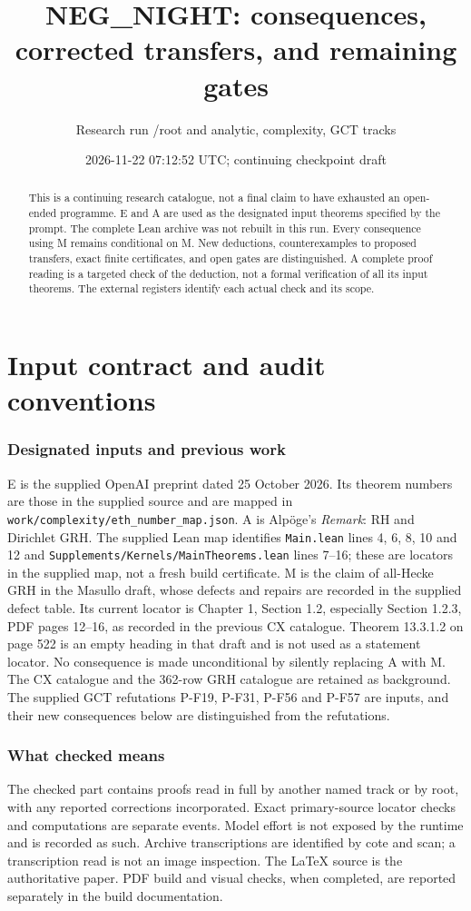 \documentclass[11pt]{article}
\title{NEG\_NIGHT: consequences, corrected transfers, and remaining gates}
\author{Research run /root and analytic, complexity, GCT tracks}
\date{2026-11-22 07:12:52 UTC; continuing checkpoint draft}
\theoremstyle{definition}
\begin{document}
\maketitle
\begin{abstract}
This is a continuing research catalogue, not a final claim to have exhausted
an open-ended programme. E and A are used as the designated input theorems
specified by the prompt. The complete Lean archive was not rebuilt in this
run. Every consequence using M remains conditional on M. New deductions,
counterexamples to proposed transfers, exact finite certificates, and open
gates are distinguished. A complete proof reading is a targeted check of the
deduction, not a formal verification of all its input theorems. The external
registers identify each actual check and its scope.
\end{abstract}
\tableofcontents
\part{Input contract and audit conventions}
\section{Designated inputs and previous work}
E is the supplied OpenAI preprint dated 25 October 2026. Its theorem numbers
are those in the supplied source and are mapped in
\texttt{work/complexity/eth\_number\_map.json}. A is Alp\"oge's
\emph{Remark}: RH and Dirichlet GRH. The supplied Lean map identifies
\texttt{Main.lean} lines 4, 6, 8, 10 and 12 and
\texttt{Supplements/Kernels/MainTheorems.lean} lines 7--16;
these are locators in the supplied map, not a fresh build certificate.
M is the claim of all-Hecke GRH in the Masullo draft, whose defects and
repairs are recorded in the supplied defect table. Its current locator is
Chapter 1, Section 1.2, especially Section 1.2.3, PDF pages 12--16,
as recorded in the previous CX catalogue. Theorem 13.3.1.2 on page 522
is an empty heading in that draft and is not used as a statement locator.
No consequence is made
unconditional by silently replacing A with M.
The CX catalogue and the 362-row GRH catalogue are retained as background.
The supplied GCT refutations P-F19, P-F31, P-F56 and P-F57 are inputs,
and their new consequences below are distinguished from the refutations.
\section{What checked means}
The checked part contains proofs read in full by another named track or by
root, with any reported corrections incorporated. Exact primary-source
locator checks and computations are separate events. Model effort is not
exposed by the runtime and is recorded as such. Archive transcriptions are
identified by cote and scan; a transcription read is not an image inspection.
The LaTeX source is the authoritative paper. PDF build and visual checks,
when completed, are reported separately in the build documentation.
\end{document}
